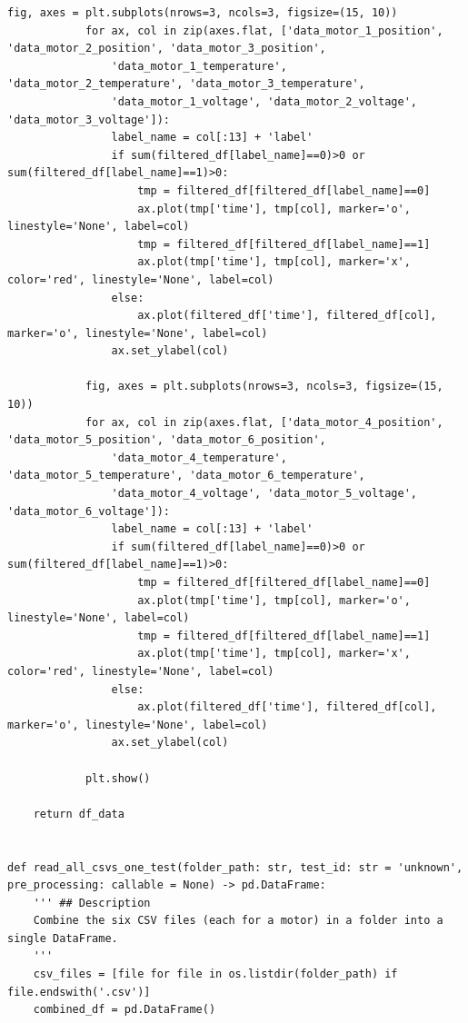 \documentclass[11pt,a4paper]{article}
\begin{document}
\begin{lstlisting}[style=pyfull]
            fig, axes = plt.subplots(nrows=3, ncols=3, figsize=(15, 10))
            for ax, col in zip(axes.flat, ['data_motor_1_position', 'data_motor_2_position', 'data_motor_3_position',
                'data_motor_1_temperature', 'data_motor_2_temperature', 'data_motor_3_temperature',
                'data_motor_1_voltage', 'data_motor_2_voltage', 'data_motor_3_voltage']):
                label_name = col[:13] + 'label'
                if sum(filtered_df[label_name]==0)>0 or sum(filtered_df[label_name]==1)>0:
                    tmp = filtered_df[filtered_df[label_name]==0]
                    ax.plot(tmp['time'], tmp[col], marker='o', linestyle='None', label=col)
                    tmp = filtered_df[filtered_df[label_name]==1]
                    ax.plot(tmp['time'], tmp[col], marker='x', color='red', linestyle='None', label=col)
                else:
                    ax.plot(filtered_df['time'], filtered_df[col], marker='o', linestyle='None', label=col)
                ax.set_ylabel(col)

            fig, axes = plt.subplots(nrows=3, ncols=3, figsize=(15, 10))
            for ax, col in zip(axes.flat, ['data_motor_4_position', 'data_motor_5_position', 'data_motor_6_position',
                'data_motor_4_temperature', 'data_motor_5_temperature', 'data_motor_6_temperature',
                'data_motor_4_voltage', 'data_motor_5_voltage', 'data_motor_6_voltage']):
                label_name = col[:13] + 'label'
                if sum(filtered_df[label_name]==0)>0 or sum(filtered_df[label_name]==1)>0:
                    tmp = filtered_df[filtered_df[label_name]==0]
                    ax.plot(tmp['time'], tmp[col], marker='o', linestyle='None', label=col)
                    tmp = filtered_df[filtered_df[label_name]==1]
                    ax.plot(tmp['time'], tmp[col], marker='x', color='red', linestyle='None', label=col)
                else:
                    ax.plot(filtered_df['time'], filtered_df[col], marker='o', linestyle='None', label=col)
                ax.set_ylabel(col)

            plt.show()

    return df_data


def read_all_csvs_one_test(folder_path: str, test_id: str = 'unknown', pre_processing: callable = None) -> pd.DataFrame:
    ''' ## Description
    Combine the six CSV files (each for a motor) in a folder into a single DataFrame.
    '''
    csv_files = [file for file in os.listdir(folder_path) if file.endswith('.csv')]
    combined_df = pd.DataFrame()


\end{lstlisting}
\end{document}
